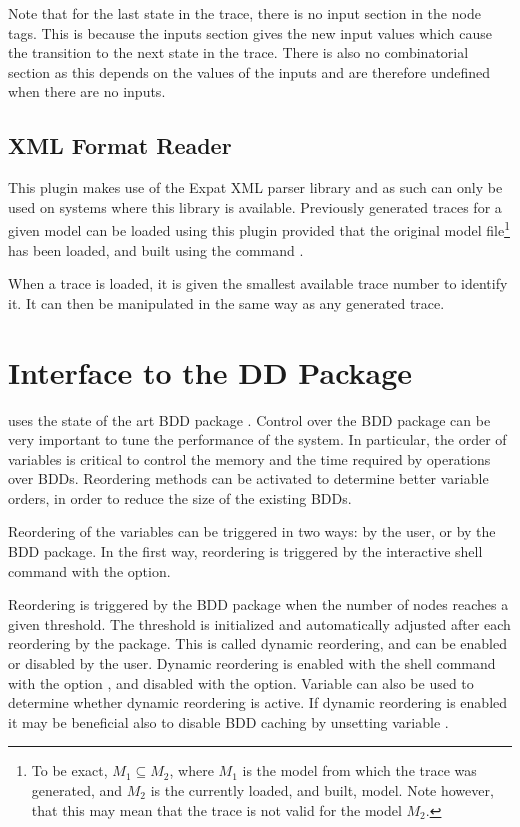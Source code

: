 Note that for the last state in the trace, there is no input section
in the node tags. This is because the inputs section gives the new
input values which cause the transition to the next state in the
trace. There is also no combinatorial section as this depends on the
values of the inputs and are therefore undefined when there are no
inputs.


\subsection{XML Format Reader}
\label{XML Format Reader}

This plugin makes use of the Expat XML parser library and as such can
only be used on systems where this library is available. Previously
generated traces for a given model can be loaded using this plugin
provided that the original model file\footnote{To be exact, $M_1
\subseteq M_2$, where $M_1$ is the model from which the trace was
generated, and $M_2$ is the currently loaded, and built, model. Note
however, that this may mean that the trace is not valid for the model
$M_2$.} has been loaded, and built using the command .

When a trace is loaded, it is given the smallest available trace
number to identify it. It can then be manipulated in the same way as
any generated trace.


\section{Interface to the DD Package}
\label{Interface to DD package}
\label{DD package interface}

\nusmv uses the state of the art BDD package \cudd \cite{Som98}.
Control over the BDD package can be very important to tune the
performance of the system. In particular, the order of variables is
critical to control the memory and the time required by operations
over BDDs.  Reordering methods can be activated to determine better
variable orders, in order to reduce the size of the existing BDDs.

Reordering of the variables can be triggered in two ways: by the user,
or by the BDD package.  In the first way, reordering is triggered by
the interactive shell command  with the
 option.

Reordering is triggered by the BDD package when the number of nodes
reaches a given threshold. The threshold is initialized and
automatically adjusted after each reordering by the package.  This is
called dynamic reordering, and can be enabled or disabled by the
user.  Dynamic reordering is enabled with the shell command
 with the option , and disabled
with the  option. Variable  can also be used
to determine whether dynamic reordering is active.
%
If dynamic reordering is enabled it may be beneficial also to disable 
BDD caching by unsetting variable .

